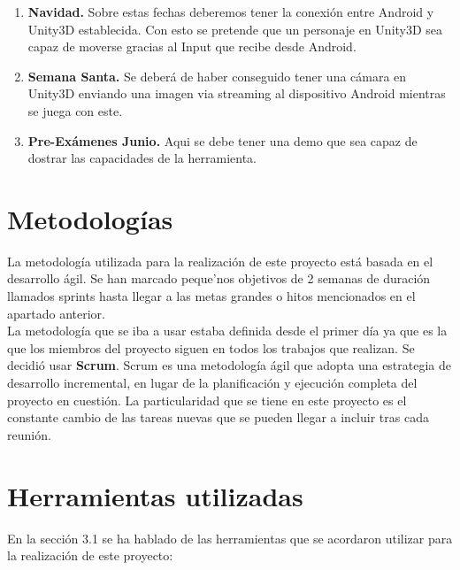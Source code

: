  
\begin{enumerate}

\item \textbf{Navidad.} Sobre estas fechas deberemos tener la conexi\'on entre Android y Unity3D establecida. Con esto se pretende que un personaje en Unity3D sea capaz de moverse gracias al Input que recibe desde Android.
\item \textbf{Semana Santa.} Se deber\'a de haber conseguido tener una c\'amara en Unity3D enviando una imagen via streaming al dispositivo Android mientras se juega con este.
\item \textbf{Pre-Ex\'amenes Junio.} Aqui se debe tener una demo que sea capaz de dostrar las capacidades de la herramienta.

\end{enumerate}



\section{Metodolog\'ias}
\label{cap3:sec:metodologias}

La metodolog\'ia utilizada para la realizaci\'on de este proyecto est\'a basada en el desarrollo \'agil. Se han marcado peque'nos objetivos de 2 semanas de duraci\'on llamados sprints hasta llegar a las metas grandes o hitos mencionados en el apartado anterior.\\
La metodolog\'ia que se iba a usar estaba definida desde el primer d\'ia ya que es la que los miembros del proyecto siguen en todos los trabajos que realizan. Se decidi\'o usar \textbf{Scrum}.
Scrum es una metodolog\'ia \'agil que adopta una estrategia de desarrollo incremental, en lugar de la planificaci\'on y ejecuci\'on completa del proyecto en cuesti\'on. La particularidad que se tiene en este proyecto es el constante cambio de las tareas nuevas que se pueden llegar a incluir tras cada reuni\'on.

\section{Herramientas utilizadas}
\label{cap3:sec:herramientas}

En la secci\'on 3.1 se ha hablado de las herramientas que se acordaron utilizar para la realizaci\'on de este proyecto:

